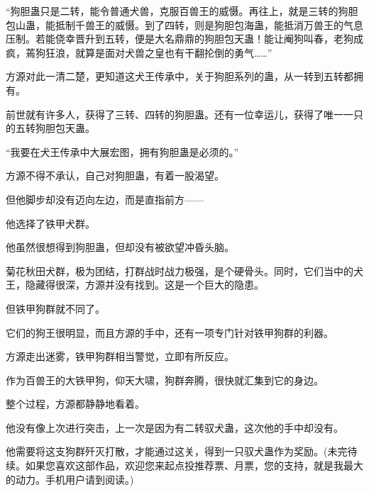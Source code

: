 \begin{this_body}
“狗胆蛊只是二转，能令普通犬兽，克服百兽王的威慑。再往上，就是三转的狗胆包山蛊，能抵制千兽王的威慑。到了四转，则是狗胆包海蛊，能抵消万兽王的气息压制。若能侥幸晋升到五转，便是大名鼎鼎的狗胆包天蛊！能让阉狗叫春，老狗成疯，蔫狗狂浪，就算是面对犬兽之皇也有干翻抡倒的勇气……”

方源对此一清二楚，更知道这犬王传承中，关于狗胆系列的蛊，从一转到五转都拥有。

前世就有许多人，获得了三转、四转的狗胆蛊。还有一位幸运儿，获得了唯一一只的五转狗胆包天蛊。

“我要在犬王传承中大展宏图，拥有狗胆蛊是必须的。”

方源不得不承认，自己对狗胆蛊，有着一股渴望。

但他脚步却没有迈向左边，而是直指前方——

他选择了铁甲犬群。

他虽然很想得到狗胆蛊，但却没有被欲望冲昏头脑。

菊花秋田犬群，极为团结，打群战时战力极强，是个硬骨头。同时，它们当中的犬王，隐藏得很深，方源并没有找到。这是一个巨大的隐患。

但铁甲狗群就不同了。

它们的狗王很明显，而且方源的手中，还有一项专门针对铁甲狗群的利器。

方源走出迷雾，铁甲狗群相当警觉，立即有所反应。

作为百兽王的大铁甲狗，仰天大啸，狗群奔腾，很快就汇集到它的身边。

整个过程，方源都静静地看着。

他没有像上次进行突击，上一次是因为有二转驭犬蛊，这次他的手中却没有。

他需要将这支狗群歼灭打散，才能通过这关，得到一只驭犬蛊作为奖励。(未完待续。如果您喜欢这部作品，欢迎您来起点投推荐票、月票，您的支持，就是我最大的动力。手机用户请到阅读。)

\end{this_body}

